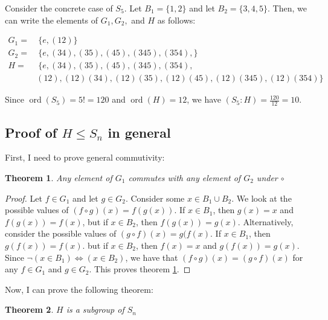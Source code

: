 \documentclass[12pt]{article}
\newcommand{\ord}{\operatorname{ord}}
\newtheorem{thm}{Theorem}
\begin{document}
Consider the concrete case of $S_5$.
Let $B_1 = \{1, 2\}$ and let $B_2 = \{3, 4, 5\}$.
Then, we can write the elements of $G_1, G_2,$ and $H$ as follows:

\begin{align*}
	G_1 = &\ \{e, (12)\} \\
	G_2 = &\ \{e, (34),(35),(45),(345),(354),\} \\
	H = &\ \{e, (34),(35),(45),(345),(354), \\
	    & (12), (12)(34),(12)(35),(12)(45),(12)(345),(12)(354) \}
\end{align*}

Since $\ord(S_5) = 5! = 120$
and $\ord(H) = 12$,
we have $(S_5:H) = \frac{120}{12} = 10$.

\subsection{Proof of $H \le S_n$ in general}

First, I need to prove general commutivity:

\begin{thm} \label{thm9}
	Any element of $G_1$ commutes with any element of $G_2$ under $\circ$	
\end{thm}

\begin{proof}
	Let $f \in G_1$ and let $g \in G_2$.
	Consider some $x \in B_1 \cup B_2$.
	We look at the possible values
	of $(f \circ g)(x) = f(g(x))$.
	If $x \in B_1$, then $g(x) = x$ and $f(g(x)) = f(x)$,
	but if $x \in B_2$, then $f(g(x)) = g(x)$.
	Alternatively,
	consider the possible values
	of $(g \circ f)(x) = g(f(x)$.
	If $x \in B_1$, then $g(f(x)) = f(x)$.
	but if $x \in B_2$, then $f(x) = x$ and $g(f(x)) = g(x)$.
	Since $\neg(x \in B_1) \iff (x \in B_2)$,
	we have that $(f \circ g)(x) = (g \circ f)(x)$
	for any $f \in G_1$ and $g \in G_2$.
	This proves theorem \ref{thm9}.
\end{proof}

Now, I can prove the following theorem:

\begin{thm} \label{thm8}
	$H$ is a subgroup of $S_n$
\end{thm}
\end{document}

